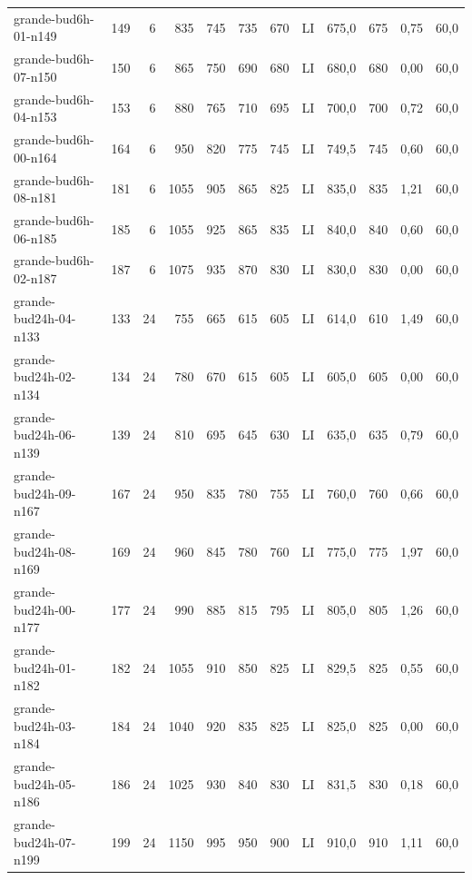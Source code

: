 \begin{longtable}{@{}lrrrrrrlrrrr@{}}
grande-bud6h-01-n149 & 149 & 6 & 835 & 745 & 735 & 670 & LI & 675,0 & 675 & 0,75 & 60,0 \\
grande-bud6h-07-n150 & 150 & 6 & 865 & 750 & 690 & 680 & LI & 680,0 & 680 & 0,00 & 60,0 \\
grande-bud6h-04-n153 & 153 & 6 & 880 & 765 & 710 & 695 & LI & 700,0 & 700 & 0,72 & 60,0 \\
grande-bud6h-00-n164 & 164 & 6 & 950 & 820 & 775 & 745 & LI & 749,5 & 745 & 0,60 & 60,0 \\
grande-bud6h-08-n181 & 181 & 6 & 1055 & 905 & 865 & 825 & LI & 835,0 & 835 & 1,21 & 60,0 \\
grande-bud6h-06-n185 & 185 & 6 & 1055 & 925 & 865 & 835 & LI & 840,0 & 840 & 0,60 & 60,0 \\
grande-bud6h-02-n187 & 187 & 6 & 1075 & 935 & 870 & 830 & LI & 830,0 & 830 & 0,00 & 60,0 \\
grande-bud24h-04-n133 & 133 & 24 & 755 & 665 & 615 & 605 & LI & 614,0 & 610 & 1,49 & 60,0 \\
grande-bud24h-02-n134 & 134 & 24 & 780 & 670 & 615 & 605 & LI & 605,0 & 605 & 0,00 & 60,0 \\
grande-bud24h-06-n139 & 139 & 24 & 810 & 695 & 645 & 630 & LI & 635,0 & 635 & 0,79 & 60,0 \\
grande-bud24h-09-n167 & 167 & 24 & 950 & 835 & 780 & 755 & LI & 760,0 & 760 & 0,66 & 60,0 \\
grande-bud24h-08-n169 & 169 & 24 & 960 & 845 & 780 & 760 & LI & 775,0 & 775 & 1,97 & 60,0 \\
grande-bud24h-00-n177 & 177 & 24 & 990 & 885 & 815 & 795 & LI & 805,0 & 805 & 1,26 & 60,0 \\
grande-bud24h-01-n182 & 182 & 24 & 1055 & 910 & 850 & 825 & LI & 829,5 & 825 & 0,55 & 60,0 \\
grande-bud24h-03-n184 & 184 & 24 & 1040 & 920 & 835 & 825 & LI & 825,0 & 825 & 0,00 & 60,0 \\
grande-bud24h-05-n186 & 186 & 24 & 1025 & 930 & 840 & 830 & LI & 831,5 & 830 & 0,18 & 60,0 \\
grande-bud24h-07-n199 & 199 & 24 & 1150 & 995 & 950 & 900 & LI & 910,0 & 910 & 1,11 & 60,0 \\
\end{longtable}
\endgroup
